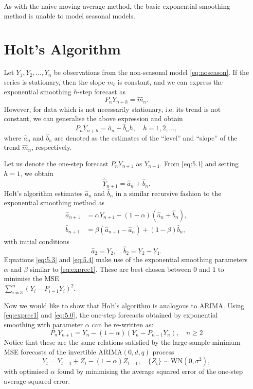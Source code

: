 \documentclass[a4paper, oneside]{discothesis}
\begin{document}
As with the naive moving average method, the basic exponential smoothing method is unable to model seasonal models.

\section{Holt's Algorithm}
Let $Y_1, Y_2, \dots, Y_n$ be observations from the non-seasonal model \eqref{eq:noseason}. If the series is stationary, then the slope $m_t$ is constant, and we can express the exponential smoothing $h$-step forecast as
\begin{equation} \label{eq:5.0}
    P_n Y_{n+h} = \hat{m}_n.
\end{equation}
However, for data which is not necessarily stationary, i.e. its trend is not constant, we can generalise the above expression and obtain
\begin{equation}\label{eq:5.1}
	P_n Y_{n+h} = \hat{a}_n + \hat{b}_n h, \quad h = 1, 2, \dots ,
\end{equation}
where $\hat{a}_n$ and $\hat{b}_n$ are denoted as the estimates of the ``level'' and ``slope'' of the trend $\hat{m}_n$, respectively.

Let us denote the one-step forecast $P_n Y_{n+1}$ as $Y_{n+1}$. From \eqref{eq:5.1} and setting $h=1$, we obtain
\begin{equation}\label{eq:5.2}
	\hat{Y}_{n+1} = \hat{a}_n + \hat{b}_n.
\end{equation}
\newpage
Holt's algorithm estimates $\hat{a}_n$ and $\hat{b}_n$ in a similar recursive fashion to the exponential smoothing method as
\begin{align}
	\hat{a}_{n+1} &= \alpha Y_{n+1} + (1-\alpha)(\hat{a}_n + \hat{b}_n), \label{eq:5.3} \\
	\hat{b}_{n+1} &= \beta(\hat{a}_{n+1} - \hat{a}_n) + (1-\beta)\hat{b}_n, \label{eq:5.4}
\end{align}
with initial conditions
\begin{equation*}
    \hat{a}_2 = Y_2, \quad \hat{b}_2 = Y_2 - Y_1.
\end{equation*}
Equations \eqref{eq:5.3} and \eqref{eq:5.4} make use of the exponential smoothing parameters $\alpha$ and $\beta$ similar to \eqref{eq:exprec1}. These are best chosen between $0$ and $1$ to minimise the MSE \\ $\sum_{i=3}^n (Y_i - P_{i-1} Y_i)^2$.

Now we would like to show that Holt's algorithm is analogous to ARIMA. Using \eqref{eq:exprec1} and \eqref{eq:5.0}, the one-step forecasts obtained by exponential smoothing with parameter $\alpha$ can be re-written as:
\begin{equation}
    P_nY_{n+1} = Y_n - (1-\alpha)(Y_n - P_{n-1}Y_n), \quad n \geq 2
\end{equation}
Notice that these are the same relations satisfied by the large-sample minimum MSE forecasts of the invertible $\mathrm{ARIMA}(0,d,q)$ process
\begin{equation} \label{eq:5.8}
    Y_t = Y_{t-1} + Z_t - (1-\alpha) Z_{t-1}, \quad \{Z_t\} \sim \mathrm{WN}(0, \sigma^2),
\end{equation}
with optimised $\alpha$ found by minimising the average squared error of the one-step average squared error.
\end{document}
